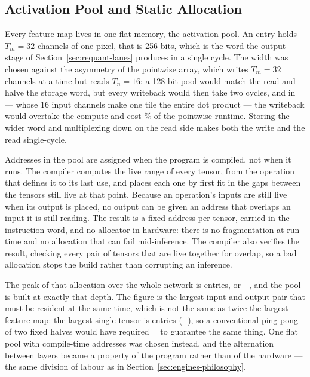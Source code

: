 \subsection{Activation Pool and Static Allocation}
\label{sec:act-pool}

Every feature map lives in one flat memory, the activation pool. An entry holds
$T_m = 32$ channels of one pixel, that is 256 bits, which is the word the
output stage of Section~\ref{sec:requant-lanes} produces in a single cycle.
The width was chosen against the asymmetry of the pointwise array, which writes
$T_m = 32$ channels at a time but reads $T_n = 16$: a 128-bit pool would match
the read and halve the storage word, but every writeback would then take two
cycles, and in  --- whose 16 input channels make one
tile the entire dot product --- the writeback would overtake the compute and
cost \thNarrowPoolPct\% of the pointwise runtime. Storing the wider word and
multiplexing down on the read side makes both the write and the read
single-cycle.

Addresses in the pool are assigned when the program is compiled, not when it
runs. The compiler computes the live range of every tensor, from the operation
that defines it to its last use, and places each one by first fit in the gaps
between the tensors still live at that point. Because an operation's inputs are
still live when its output is placed, no output can be given an address that
overlaps an input it is still reading. The result is a fixed address per
tensor, carried in the instruction word, and no allocator in hardware: there is
no fragmentation at run time and no allocation that can fail mid-inference. The
compiler also verifies the result, checking every pair of tensors that are live
together for overlap, so a bad allocation stops the build rather than
corrupting an inference.

The peak of that allocation over the whole network is \thPoolEntries{} entries,
or \thPoolMiB\,\si{\mebi\byte}, and the pool is built at exactly that depth.
The figure is the largest input and output pair that must be resident at the
same time, which is not the same as twice the largest feature map: the largest
single tensor is \thPoolLargest{} entries
(\thPoolLargestMiB\,\si{\mebi\byte}), so a conventional ping-pong of two fixed
halves would have required \thPingPongMiB\,\si{\mebi\byte} to guarantee the
same thing. One flat pool with compile-time addresses was chosen instead, and
the alternation between layers became a property of the program rather than of
the hardware --- the same division of labour as in
Section~\ref{sec:engines-philosophy}.


